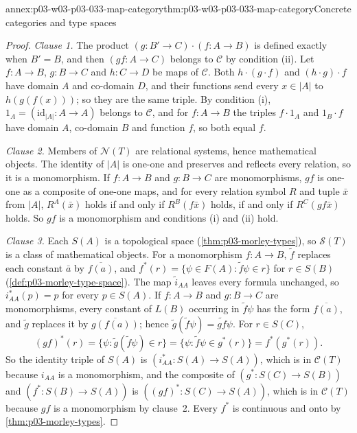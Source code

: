 \begin{annexitem}{annex:p03-w03-p03-033-map-category}{thm:p03-w03-p03-033-map-category}{Concrete categories and type spaces}
\begin{proof}
\emph{Clause 1.} The product \((g:B'\to C)\cdot(f:A\to B)\) is defined
exactly when \(B'=B\), and then \((gf:A\to C)\) belongs to \(\mathscr C\)
by condition (ii). Let \(f:A\to B\), \(g:B\to C\) and \(h:C\to D\) be
maps of \(\mathscr C\). Both \(h\cdot(g\cdot f)\) and \((h\cdot g)\cdot f\)
have domain \(A\) and co-domain \(D\), and their functions send every
\(x\in|A|\) to \(h(g(f(x)))\); so they are the same triple. By condition
(i), \(1_A=(\mathrm{id}_{|A|}:A\to A)\) belongs to \(\mathscr C\), and for
\(f:A\to B\) the triples \(f\cdot1_A\) and \(1_B\cdot f\) have domain
\(A\), co-domain \(B\) and function \(f\), so both equal \(f\).

\emph{Clause 2.} Members of \(\mathcal N(T)\) are relational systems,
hence mathematical objects. The identity of \(|A|\) is one-one and
preserves and reflects every relation, so it is a monomorphism. If
\(f:A\to B\) and \(g:B\to C\) are monomorphisms, \(gf\) is one-one as a
composite of one-one maps, and for every relation symbol \(R\) and tuple
\(\bar x\) from \(|A|\), \(R^A(\bar x)\) holds if and only if
\(R^B(f\bar x)\) holds, if and only if \(R^C(gf\bar x)\) holds. So \(gf\)
is a monomorphism and conditions (i) and (ii) hold.

\emph{Clause 3.} Each \(S(A)\) is a topological space
(\cref{thm:p03-morley-types}), so \(\mathscr S(T)\) is a class of
mathematical objects. For a monomorphism \(f:A\to B\), \(\tilde f\)
replaces each constant \(\bar a\) by \(\overline{f(a)}\), and
\(f^*(r)=\{\psi\in F(A):\tilde f\psi\in r\}\) for \(r\in S(B)\)
(\cref{def:p03-morley-type-space}). The map \(\tilde i_{AA}\) leaves every
formula unchanged, so \(i_{AA}^*(p)=p\) for every \(p\in S(A)\). If
\(f:A\to B\) and \(g:B\to C\) are monomorphisms, every constant of
\(L(B)\) occurring in \(\tilde f\psi\) has the form \(\overline{f(a)}\),
and \(\tilde g\) replaces it by \(\overline{g(f(a))}\); hence
\(\tilde g(\tilde f\psi)=\widetilde{gf}\psi\). For \(r\in S(C)\),
\[
 (gf)^*(r)=\{\psi:\tilde g(\tilde f\psi)\in r\}
          =\{\psi:\tilde f\psi\in g^*(r)\}
          =f^*(g^*(r)).
\]
So the identity triple of \(S(A)\) is \((i_{AA}^*:S(A)\to S(A))\), which
is in \(\mathscr C(T)\) because \(i_{AA}\) is a monomorphism, and the
composite of \((g^*:S(C)\to S(B))\) and \((f^*:S(B)\to S(A))\) is
\(((gf)^*:S(C)\to S(A))\), which is in \(\mathscr C(T)\) because \(gf\) is
a monomorphism by clause~2. Every \(f^*\) is continuous and onto by
\cref{thm:p03-morley-types}.
\end{proof}
\end{annexitem}

